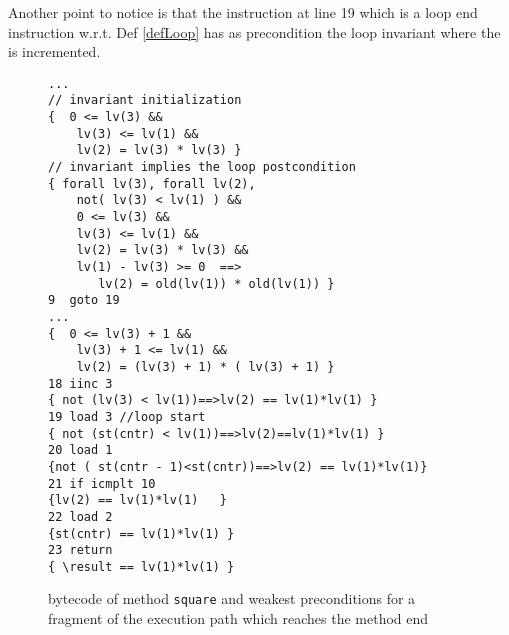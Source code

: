 Another point to notice is that the instruction at line 19 which is a loop end instruction w.r.t. Def \ref{defLoop} has as precondition the loop invariant where the 
 is incremented.

\begin{figure}
\begin{lstlisting}[frame=trbl]
...
// invariant initialization
{  0 <= lv(3) && 
    lv(3) <= lv(1) && 
    lv(2) = lv(3) * lv(3) } 
// invariant implies the loop postcondition 
{ forall lv(3), forall lv(2),
    not( lv(3) < lv(1) ) && 
    0 <= lv(3) && 
    lv(3) <= lv(1) && 
    lv(2) = lv(3) * lv(3) &&
    lv(1) - lv(3) >= 0  ==> 
       lv(2) = old(lv(1)) * old(lv(1)) }
9  goto 19
...
{  0 <= lv(3) + 1 && 
    lv(3) + 1 <= lv(1) && 
    lv(2) = (lv(3) + 1) * ( lv(3) + 1) } 
18 iinc 3
{ not (lv(3) < lv(1))==>lv(2) == lv(1)*lv(1) }
19 load 3 //loop start
{ not (st(cntr) < lv(1))==>lv(2)==lv(1)*lv(1) }
20 load 1
{not ( st(cntr - 1)<st(cntr))==>lv(2) == lv(1)*lv(1)}
21 if icmplt 10
{lv(2) == lv(1)*lv(1)   }
22 load 2
{st(cntr) == lv(1)*lv(1) }
23 return
{ \result == lv(1)*lv(1) }
\end{lstlisting} 
\caption{\sc  bytecode of method \lstinline!square! and weakest preconditions for  a fragment of the execution path which reaches the method end}
\label{wp:example:sqrBcVc}
\end{figure}


